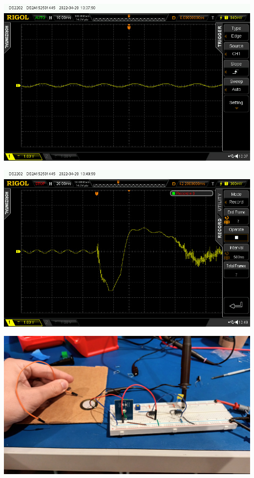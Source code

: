 \documentclass[11pt,french,a4paper]{article}
\begin{document}
\begin{center}	
\includegraphics[scale=0.5]{../img/plat.jpg}
\label{VWOMVM}
\end{center}

\begin{center}	
\includegraphics[scale=0.5]{../img/frotment.jpg}
\label{F}
\end{center}

\begin{center}	
\includegraphics[scale=0.1]{../img/froty.jpg}
\label{M}
\end{center}
\end{document}
